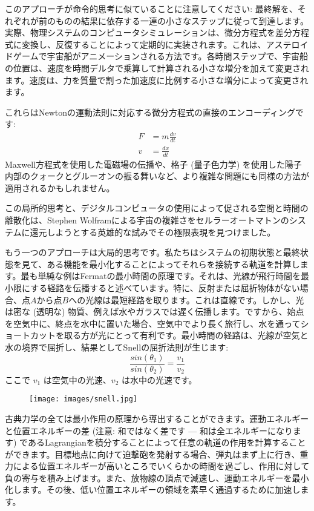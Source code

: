 このアプローチが命令的思考に似ていることに注意してください: 最終解を、それぞれが前のものの結果に依存する一連の小さなステップに従って到達します。実際、物理システムのコンピュータシミュレーションは、微分方程式を差分方程式に変換し、反復することによって定期的に実装されます。これは、アステロイドゲームで宇宙船がアニメーションされる方法です。各時間ステップで、宇宙船の位置は、速度を時間デルタで乗算して計算される小さな増分を加えて変更されます。速度は、力を質量で割った加速度に比例する小さな増分によって変更されます。

これらはNewtonの運動法則に対応する微分方程式の直接のエンコーディングです: 
\begin{align*}
  F & = m \frac{dv}{dt} \\
  v & = \frac{dx}{dt}
\end{align*}
Maxwell方程式を使用した電磁場の伝播や、格子 (量子色力学) を使用した陽子内部のクォークとグルーオンの振る舞いなど、より複雑な問題にも同様の方法が適用されるかもしれません。

この局所的思考と、デジタルコンピュータの使用によって促される空間と時間の離散化は、Stephen Wolframによる宇宙の複雑さをセルラーオートマトンのシステムに還元しようとする英雄的な試みでその極限表現を見つけました。

もう一つのアプローチは大局的思考です。私たちはシステムの初期状態と最終状態を見て、ある機能を最小化することによってそれらを接続する軌道を計算します。最も単純な例はFermatの最小時間の原理です。それは、光線が飛行時間を最小限にする経路を伝播すると述べています。特に、反射または屈折物体がない場合、点$A$から点$B$への光線は最短経路を取ります。これは直線です。しかし、光は密な (透明な) 物質、例えば水やガラスでは遅く伝播します。ですから、始点を空気中に、終点を水中に置いた場合、空気中でより長く旅行し、水を通ってショートカットを取る方が光にとって有利です。最小時間の経路は、光線が空気と水の境界で屈折し、結果としてSnellの屈折法則が生じます: 
\begin{equation*}
  \frac{sin(\theta_1)}{sin(\theta_2)} = \frac{v_1}{v_2}
\end{equation*}
ここで $v_1$ は空気中の光速、$v_2$ は水中の光速です。

\begin{figure}[H]
  \centering
  \texttt{[image: images/snell.jpg]}
\end{figure}

\noindent
古典力学の全ては最小作用の原理から導出することができます。運動エネルギーと位置エネルギーの差 (注意: 和ではなく差です --- 和は全エネルギーになります) であるLagrangianを積分することによって任意の軌道の作用を計算することができます。目標地点に向けて迫撃砲を発射する場合、弾丸はまず上に行き、重力による位置エネルギーが高いところでいくらかの時間を過ごし、作用に対して負の寄与を積み上げます。また、放物線の頂点で減速し、運動エネルギーを最小化します。その後、低い位置エネルギーの領域を素早く通過するために加速します。

